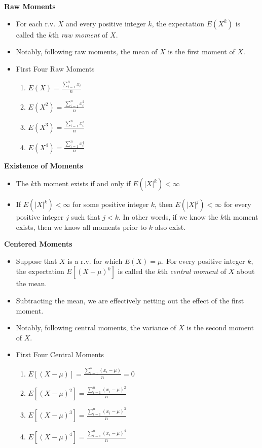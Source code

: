 \documentclass[11pt]{article}
\begin{document}
\textbf{Raw Moments}
\begin{itemize}
    \item For each r.v. $X$ and every positive integer $k$, the expectation $E(X^k)$ is called 
    the $k$th \textit{raw moment} of $X$.
    \item Notably, following raw moments, the mean of $X$ is the first moment of $X$.
    \item First Four Raw Moments
    \begin{enumerate}
        \item $E(X)=\frac{\sum_{i=1}^{n} x_i}{n}$
        \item $E(X^2)=\frac{\sum_{i=1}^{n} x_i^2}{n}$
        \item $E(X^3)=\frac{\sum_{i=1}^{n} x_i^3}{n}$
        \item $E(X^4)=\frac{\sum_{i=1}^{n} x_i^4}{n}$
    \end{enumerate}
\end{itemize}

\textbf{Existence of Moments}
\begin{itemize}
    \item The $k$th moment exists if and only if $E({|X|}^k) < \infty$
    \item If $E({|X|}^k) < \infty$ for some positive integer $k$, then $E({|X|}^j) < \infty$ 
    for every positive integer $j$ such that $j < k$. In other words, if we know the $k$th 
    moment exists, then we know all moments prior to $k$ also exist.
\end{itemize}

\textbf{Centered Moments}
\begin{itemize}
    \item Suppose that $X$ is a r.v. for which $E(X)=\mu$. For every positive integer $k$, the 
    expectation $E[{(X-\mu)}^k]$ is called the $k$th \textit{central moment} of $X$ about the 
    mean.
    \item Subtracting the mean, we are effectively netting out the effect of the first moment.
    \item Notably, following central moments, the variance of $X$ is the second moment of $X$.
    \item First Four Central Moments
    \begin{enumerate}
        \item $E[(X-\mu)]=\frac{\sum_{i=1}^{n} (x_i-\mu)}{n}=0$
        \item $E[{(X-\mu)}^2]=\frac{\sum_{i=1}^{n} {(x_i-\mu)}^2}{n}$
        \item $E[{(X-\mu)}^3]=\frac{\sum_{i=1}^{n} {(x_i-\mu)}^3}{n}$
        \item $E[{(X-\mu)}^4]=\frac{\sum_{i=1}^{n} {(x_i-\mu)}^4}{n}$
    \end{enumerate}
\end{itemize}
\end{document}
